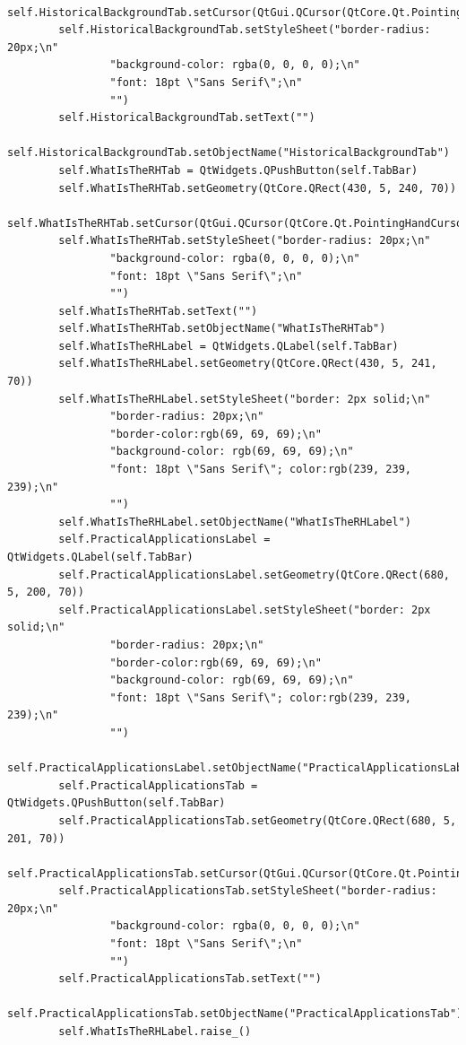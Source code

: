 \documentclass{article}
\begin{document}
\begin{lstlisting}
        self.HistoricalBackgroundTab.setCursor(QtGui.QCursor(QtCore.Qt.PointingHandCursor))
        self.HistoricalBackgroundTab.setStyleSheet("border-radius: 20px;\n"
                "background-color: rgba(0, 0, 0, 0);\n"
                "font: 18pt \"Sans Serif\";\n"
                "")
        self.HistoricalBackgroundTab.setText("")
        self.HistoricalBackgroundTab.setObjectName("HistoricalBackgroundTab")
        self.WhatIsTheRHTab = QtWidgets.QPushButton(self.TabBar)
        self.WhatIsTheRHTab.setGeometry(QtCore.QRect(430, 5, 240, 70))
        self.WhatIsTheRHTab.setCursor(QtGui.QCursor(QtCore.Qt.PointingHandCursor))
        self.WhatIsTheRHTab.setStyleSheet("border-radius: 20px;\n"
                "background-color: rgba(0, 0, 0, 0);\n"
                "font: 18pt \"Sans Serif\";\n"
                "")
        self.WhatIsTheRHTab.setText("")
        self.WhatIsTheRHTab.setObjectName("WhatIsTheRHTab")
        self.WhatIsTheRHLabel = QtWidgets.QLabel(self.TabBar)
        self.WhatIsTheRHLabel.setGeometry(QtCore.QRect(430, 5, 241, 70))
        self.WhatIsTheRHLabel.setStyleSheet("border: 2px solid;\n"
                "border-radius: 20px;\n"
                "border-color:rgb(69, 69, 69);\n"
                "background-color: rgb(69, 69, 69);\n"
                "font: 18pt \"Sans Serif\"; color:rgb(239, 239, 239);\n"
                "")
        self.WhatIsTheRHLabel.setObjectName("WhatIsTheRHLabel")
        self.PracticalApplicationsLabel = QtWidgets.QLabel(self.TabBar)
        self.PracticalApplicationsLabel.setGeometry(QtCore.QRect(680, 5, 200, 70))
        self.PracticalApplicationsLabel.setStyleSheet("border: 2px solid;\n"
                "border-radius: 20px;\n"
                "border-color:rgb(69, 69, 69);\n"
                "background-color: rgb(69, 69, 69);\n"
                "font: 18pt \"Sans Serif\"; color:rgb(239, 239, 239);\n"
                "")
        self.PracticalApplicationsLabel.setObjectName("PracticalApplicationsLabel")
        self.PracticalApplicationsTab = QtWidgets.QPushButton(self.TabBar)
        self.PracticalApplicationsTab.setGeometry(QtCore.QRect(680, 5, 201, 70))
        self.PracticalApplicationsTab.setCursor(QtGui.QCursor(QtCore.Qt.PointingHandCursor))
        self.PracticalApplicationsTab.setStyleSheet("border-radius: 20px;\n"
                "background-color: rgba(0, 0, 0, 0);\n"
                "font: 18pt \"Sans Serif\";\n"
                "")
        self.PracticalApplicationsTab.setText("")
        self.PracticalApplicationsTab.setObjectName("PracticalApplicationsTab")
        self.WhatIsTheRHLabel.raise_()

\end{lstlisting}
\end{document}
